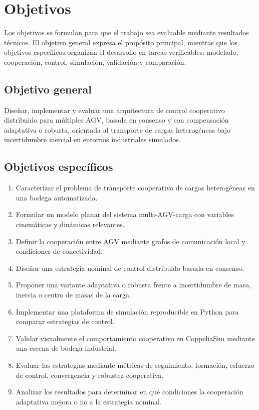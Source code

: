 \documentclass[12pt,a4paper]{article}
\begin{document}
\section{Objetivos}

Los objetivos se formulan para que el trabajo sea evaluable mediante resultados técnicos. El objetivo general expresa el propósito principal, mientras que los objetivos específicos organizan el desarrollo en tareas verificables: modelado, cooperación, control, simulación, validación y comparación.

\subsection{Objetivo general}

Diseñar, implementar y evaluar una arquitectura de control cooperativo distribuido para múltiples AGV, basada en consenso y con compensación adaptativa o robusta, orientada al transporte de cargas heterogéneas bajo incertidumbre inercial en entornos industriales simulados.

\subsection{Objetivos específicos}

\begin{enumerate}
  \item Caracterizar el problema de transporte cooperativo de cargas heterogéneas en una bodega automatizada.
  \item Formular un modelo planar del sistema multi-AGV-carga con variables cinemáticas y dinámicas relevantes.
  \item Definir la cooperación entre AGV mediante grafos de comunicación local y condiciones de conectividad.
  \item Diseñar una estrategia nominal de control distribuido basada en consenso.
  \item Proponer una variante adaptativa o robusta frente a incertidumbre de masa, inercia o centro de masas de la carga.
  \item Implementar una plataforma de simulación reproducible en Python para comparar estrategias de control.
  \item Validar visualmente el comportamiento cooperativo en CoppeliaSim mediante una escena de bodega industrial.
  \item Evaluar las estrategias mediante métricas de seguimiento, formación, esfuerzo de control, convergencia y robustez cooperativa.
  \item Analizar los resultados para determinar en qué condiciones la cooperación adaptativa mejora o no a la estrategia nominal.
\end{enumerate}
\end{document}
